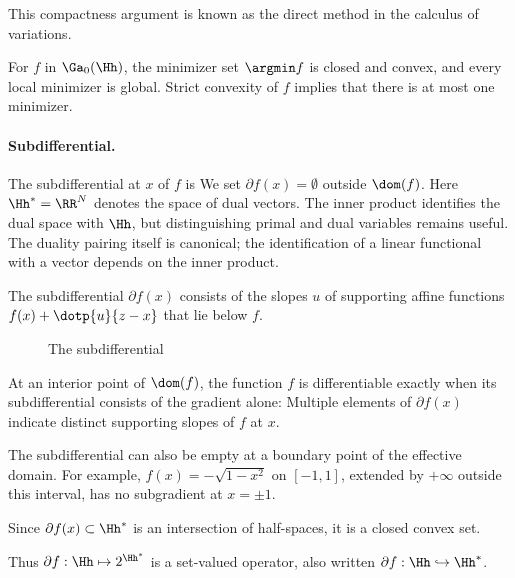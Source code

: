 This compactness argument is known as the direct method in the calculus of variations.
 
For $f$ in $\Ga_0(\Hh)$, the minimizer set $\argmin f$ is closed and convex, and every local minimizer is global. Strict convexity of $f$ implies that there is at most one minimizer.

   
\paragraph{Subdifferential.}

The subdifferential at $x$ of $f$ is
We set $\partial f(x)=\emptyset$ outside $\dom(f)$. Here $\Hh^*=\RR^N$ denotes the space of dual vectors. The inner product identifies the dual space with $\Hh$, but distinguishing primal and dual variables remains useful. The duality pairing itself is canonical; the identification of a linear functional with a vector depends on the inner product.
 
The subdifferential $\partial f(x)$ consists of the slopes $u$ of supporting affine functions $f(x) + \dotp{u}{z-x}$ that lie below $f$.


\begin{figure}[tbp]
\centering
{}
\caption{The subdifferential}
\label{fig-review-convex-analysis-subdifferential}
\end{figure}
At an interior point of $\dom(f)$, the function $f$ is differentiable exactly when its subdifferential consists of the gradient alone:
Multiple elements of $\partial f(x)$ indicate distinct supporting slopes of $f$ at $x$.

The subdifferential can also be empty at a boundary point of the effective domain. For example, $f(x)=-\sqrt{1-x^2}$ on $[-1,1]$, extended by $+\infty$ outside this interval, has no subgradient at $x=\pm1$.

Since $\partial f(x) \subset \Hh^*$ is an intersection of half-spaces, it is a closed convex set.
                                                      
 
Thus $\partial f : \Hh \mapsto 2^{\Hh^*}$ is a set-valued operator, also written $\partial f : \Hh \hookrightarrow \Hh^*$.

